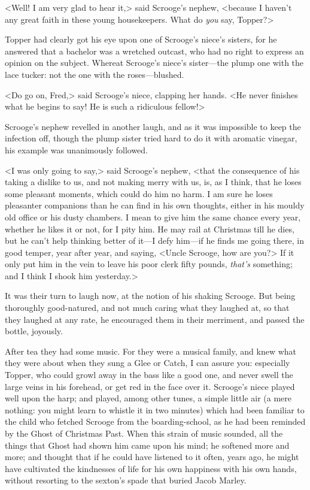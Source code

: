 <Well! I am very glad to hear it,> said Scrooge's nephew, <because I haven't any great faith in these young housekeepers. What do \textit{you} say, Topper?>

Topper had clearly got his eye upon one of Scrooge's niece's sisters, for he answered that a bachelor was a wretched outcast, who had no right to express an opinion on the subject. Whereat Scrooge's niece's sister—the plump one with the lace tucker: not the one with the roses—blushed.

<Do go on, Fred,> said Scrooge's niece, clapping her hands. <He never finishes what he begins to say! He is such a ridiculous fellow!>

Scrooge's nephew revelled in another laugh, and as it was impossible to keep the infection off, though the plump sister tried hard to do it with aromatic vinegar, his example was unanimously followed.

<I was only going to say,> said Scrooge's nephew, <that the consequence of his taking a dislike to us, and not making merry with us, is, as I think, that he loses some pleasant moments, which could do him no harm. I am sure he loses pleasanter companions than he can find in his own thoughts, either in his mouldy old office or his dusty chambers. I mean to give him the same chance every year, whether he likes it or not, for I pity him. He may rail at Christmas till he dies, but he can't help thinking better of it—I defy him—if he finds me going there, in good temper, year after year, and saying, <Uncle Scrooge, how are you?> If it only put him in the vein to leave his poor clerk fifty pounds, \textit{that's} something; and I think I shook him yesterday.>

It was their turn to laugh now, at the notion of his shaking Scrooge. But being thoroughly good-natured, and not much car\-ing what they laughed at, so that they laughed at any rate, he encouraged them in their merriment, and passed the bottle, joyously.

After tea they had some music. For they were a musical family, and knew what they were about when they sung a Glee or Catch, I can assure you: especially Topper, who could growl away in the bass like a good one, and never swell the large veins in his forehead, or get red in the face over it. Scrooge's niece played well upon the harp; and played, among other tunes, a simple little air (a mere nothing: you might learn to whistle it in two minutes) which had been familiar to the child who fetched Scrooge from the boarding-school, as he had been reminded by the Ghost of Christmas Past. When this strain of music sounded, all the things that Ghost had shown him came upon his mind; he softened more and more; and thought that if he could have listened to it often, years ago, he might have cultivated the kindnesses of life for his own happiness with his own hands, without resorting to the sexton's spade that buried Jacob Marley.

